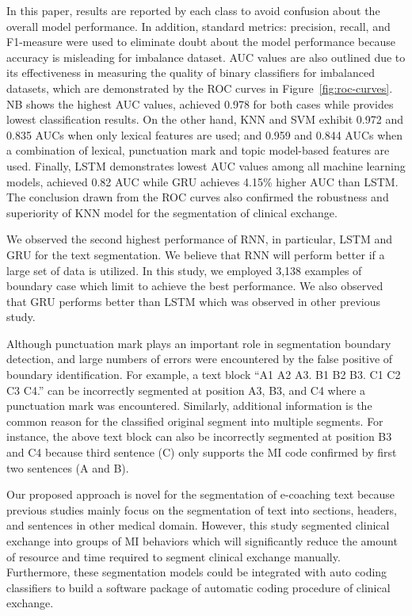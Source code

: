 \documentclass{amia}
\begin{document}
In this paper, results are reported by each class to avoid confusion about the overall model performance. In addition, standard metrics: precision, recall, and F1-measure were used to eliminate doubt about the model performance because accuracy is misleading for imbalance dataset. AUC values are also outlined due to its effectiveness in measuring the quality of binary classifiers for imbalanced datasets\cite{hu2015kernelized}, which are demonstrated by the ROC curves in Figure~\ref{fig:roc-curves}. NB shows the highest AUC values, achieved 0.978 for both cases while provides lowest classification results. On the other hand, KNN and SVM exhibit 0.972 and 0.835 AUCs when only lexical features are used; and 0.959 and 0.844 AUCs when a combination of lexical, punctuation mark and topic model-based features are used. Finally, LSTM demonstrates lowest AUC values among all machine learning models, achieved 0.82 AUC while GRU achieves 4.15\% higher AUC than LSTM. The conclusion drawn from the ROC curves also confirmed the robustness and superiority of KNN model for the segmentation of clinical exchange.      

We observed the second highest performance of RNN, in particular, LSTM and GRU for the text segmentation. We believe that RNN will perform better if a large set of data is utilized. In this study, we employed 3,138 examples of boundary case which limit to achieve the best performance. We also observed that GRU performs better than LSTM which was observed in other previous study\cite{chung2014empirical}.

Although punctuation mark plays an important role in segmentation boundary detection, and large numbers of errors were encountered by the false positive of boundary identification. For example, a text block ``A1 A2 A3. B1 B2 B3. C1 C2 C3 C4.'' can be incorrectly segmented at position A3, B3, and C4 where a punctuation mark was encountered. Similarly, additional information is the common reason for the classified original segment into multiple segments. For instance, the above text block can also be incorrectly segmented at position B3 and C4 because third sentence (C) only supports the MI code confirmed by first two sentences (A and B). 

Our proposed approach is novel for the segmentation of e-coaching text because previous studies mainly focus on the segmentation of text into sections, headers, and sentences in other medical domain. However, this study segmented clinical exchange into groups of MI behaviors which will significantly reduce the amount of resource and time required to segment clinical exchange manually. Furthermore, these segmentation models could be integrated with auto coding classifiers to build a software package of automatic coding procedure of clinical exchange.
\end{document}
